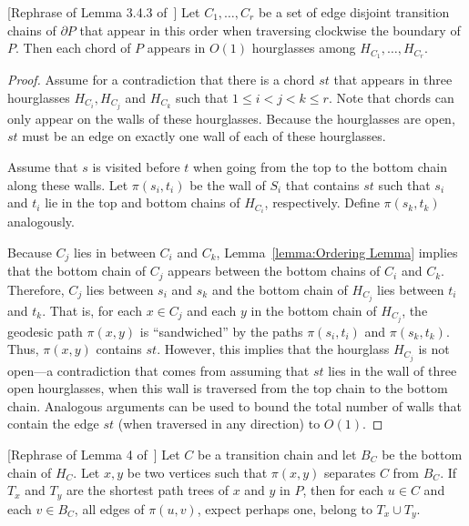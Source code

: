 \documentclass[a4paper,UKenglish]{lipics}
\newcommand{\p}[2]{\ensuremath{\pi(#1, #2)}}
\begin{document}
\begin{lemma}\label{lemma:Edges appear a constant number of times}
[Rephrase of Lemma 3.4.3 of~\cite{aronov1993furthest}]
Let $C_1, \ldots, C_r$ be a set of edge disjoint transition chains of $\partial P$ that appear in this order when traversing clockwise the boundary of $P$. Then each chord of $P$ appears in $O(1)$ hourglasses among $H_{C_1}, \ldots, H_{C_r}$.
\end{lemma}
\begin{proof}
Assume for a contradiction that there is a chord $st$ that appears in three hourglasses $H_{C_i}, H_{C_j}$ and $H_{C_k}$ such that $1\leq i < j < k\leq r$. 
Note that chords can only appear on the walls of these hourglasses. Because the hourglasses are open, $st$ must be an edge on exactly one wall of each of these hourglasses. 

Assume that $s$ is visited before $t$ when going from the top to the bottom chain along these walls.
Let $\p{s_i}{t_i}$ be the wall of $S_i$ that contains $st$ such that $s_i$ and $t_i$ lie in the top and bottom chains of $H_{C_i}$, respectively. Define $\p{s_k}{t_k}$ analogously.

Because  $C_j$ lies in between $C_i$ and $C_k$, Lemma~\ref{lemma:Ordering Lemma} implies that the bottom chain of $C_j$ appears between the bottom chains of $C_i$ and $C_k$. Therefore, $C_j$ lies between $s_i$ and $s_k$ and the bottom chain of $H_{C_j}$ lies between $t_i$ and $t_k$. 
That is, for each $x\in C_j$ and each $y$ in the bottom chain of $H_{C_j}$, the geodesic path $\p{x}{y}$ is ``sandwiched'' by the paths $\p{s_i}{t_i}$ and $\p{s_k}{t_k}$.
Thus, $\p{x}{y}$ contains $st$.
However, this implies that the hourglass $H_{C_j}$ is not open---a contradiction that comes from assuming that $st$ lies in the  wall of three open hourglasses, when this wall is traversed from the top chain to the bottom chain. 
Analogous arguments can be used to bound the total number of walls that contain the edge $st$ (when traversed in any direction) to $O(1)$.
\end{proof}

\begin{lemma}\label{lemma:Suri's lemma}
[Rephrase of Lemma 4 of~\cite{suri1989computing}]
Let $C$ be a transition chain and let $B_C$ be the bottom chain of $H_C$.
Let $x,y$ be two vertices such that $\p{x}{y}$ separates $C$ from $B_C$. 
If $T_x$ and $T_y$ are the shortest path trees of $x$ and $y$ in $P$, then for each $u\in C$ and each $v\in B_C$, all edges of $\p{u}{v}$, expect perhaps one, belong to $T_x\cup T_y$.
\end{lemma}
\end{document}
